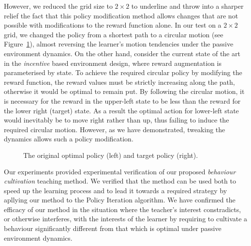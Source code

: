 However, we reduced the grid size to $2\times 2$ to underline and throw
into a sharper relief the fact that this policy modification method
allows changes that are not possible with modifications to the reward
function alone. In our test on a $2 \times 2$ grid, we changed the
policy from a shortest path to a circular motion (see
Figure~\ref{envdopt}), almost reversing the learner's motion
tendencies under the passive environment dynamics. On the other hand,
consider the current state of the art in the {\em incentive} based
environment design, where reward augmentation is parameterised by
state. To achieve the required circular policy by modifying the reward
function, the reward values must be strictly increasing along the
path, otherwise it would be optimal to remain put. By following the
circular motion, it is necessary for the reward in the upper-left
state to be less than the reward for the lower right (target)
state. As a result the optimal action for lower-left state would
inevitably be to move right rather than up, thus failing to induce the
required circular motion. However, as we have demonstrated, tweaking
the dynamics allows such a policy modification.

\begin{figure}[ht]
\centerline{}
\caption{\label{envdopt}The original optimal policy (left) and target policy (right).}
\end{figure}

Our experiments provided experimental verification of our proposed
{\em behaviour cultivation} teaching method.  We verified that the
method can be used both to speed up the learning process and to lead
it towards a required strategy by apllying our method to the Policy
Iteration algorithm. We have confirmed the efficacy of our method in
the situation where the teacher's interest constradicts, or otherwise
interferes, with the interests of the learner by requiring to
cultivate a behaviour significantly different from that which is
optimal under passive environment dynamics.
